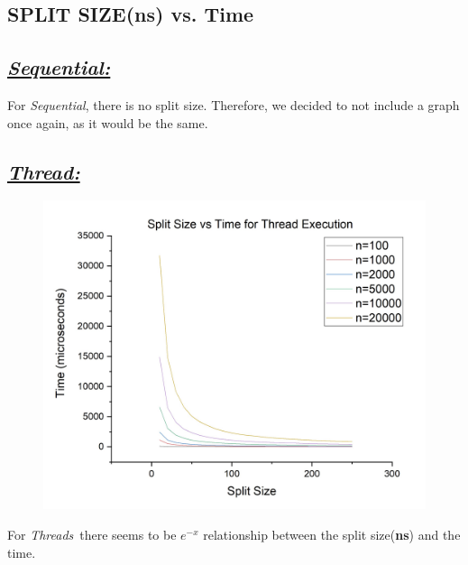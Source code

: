 \documentclass{article}
\begin{document}
        \subsection{SPLIT SIZE(\textbf{ns}) vs. Time}
            \subsection*{\textit{\underline{Sequential:}}}
                For \textit{Sequential}, there is no split size. Therefore, we decided to not include a graph once again, as it would be the same.
            \subsection*{\color{red}\textit{\underline{Thread:}}\color{black}}
                \begin{figure}[H]
                    \centering
                    \includegraphics[width=19cm]{nsvt-Thread}
                \end{figure}
                For \color{red}\textit{Threads}\color{black}\ there seems to be $e^{-x}$ relationship between the split size(\textbf{ns}) and the time. 
            \pagebreak
\end{document}
